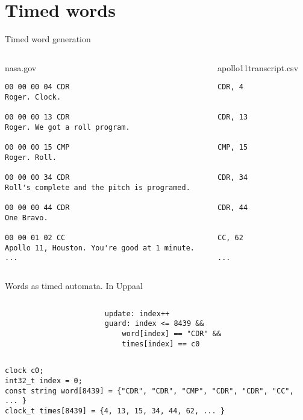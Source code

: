 \section{Timed words}
\begin{frame}[fragile]{Timed word generation}
    \begin{columns}
        \begin{column}{0.5\textwidth}
            nasa.gov
            \begin{lstlisting}[basicstyle=\tiny]
00 00 00 04 CDR
Roger. Clock.

00 00 00 13 CDR
Roger. We got a roll program.

00 00 00 15 CMP
Roger. Roll.

00 00 00 34 CDR
Roll's complete and the pitch is programed.

00 00 00 44 CDR
One Bravo.

00 00 01 02 CC
Apollo 11, Houston. You're good at 1 minute.
...
            \end{lstlisting}
        \end{column}
        \begin{column}{0.5\textwidth}
            apollo11transcript.csv
            \begin{lstlisting}[basicstyle=\tiny]
CDR, 4


CDR, 13


CMP, 15


CDR, 34


CDR, 44


CC, 62

...
            \end{lstlisting}
        \end{column}
    \end{columns}
\end{frame}

\begin{frame}[fragile]{Words as timed automata.}
    In Uppaal
    \begin{columns}
        \begin{column}{0.5\textwidth}
            
            
        \end{column}
        \begin{column}{0.5\textwidth}
            \begin{lstlisting}[basicstyle=\tiny]
update: index++
guard: index <= 8439 &&
    word[index] == "CDR" &&
    times[index] == c0
            \end{lstlisting}
        \end{column}
    \end{columns}
    \begin{lstlisting}[basicstyle=\tiny]
clock c0;
int32_t index = 0;
const string word[8439] = {"CDR", "CDR", "CMP", "CDR", "CDR", "CC", ... }
clock_t times[8439] = {4, 13, 15, 34, 44, 62, ... }
    \end{lstlisting}
\end{frame}

